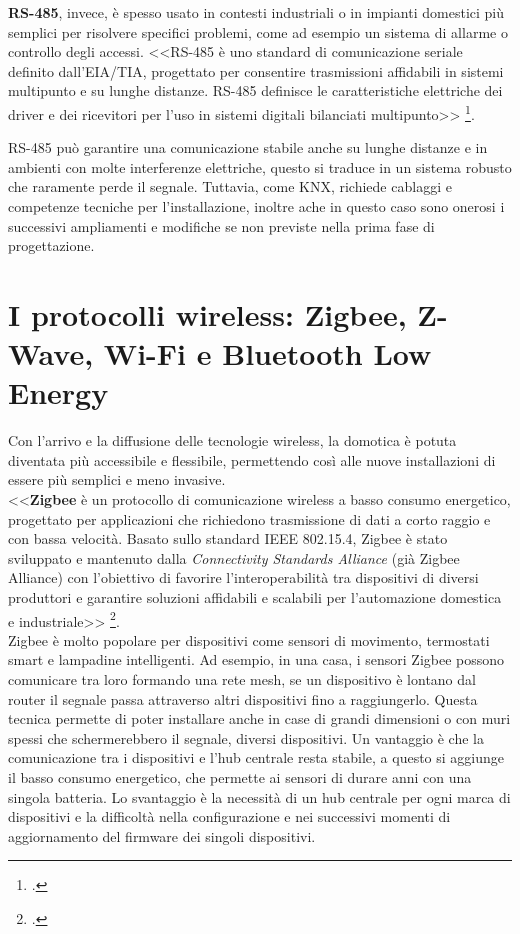 \textbf{RS-485}, invece, è spesso usato in contesti industriali o in impianti domestici più semplici per risolvere specifici problemi, come ad esempio un sistema di allarme o controllo degli accessi. 
<<RS-485 è uno standard di comunicazione seriale definito dall’EIA/TIA, progettato per consentire trasmissioni affidabili in sistemi multipunto e su lunghe distanze. RS-485 definisce le caratteristiche elettriche dei driver e dei ricevitori per l’uso in sistemi digitali bilanciati multipunto>> \footcite{wikipedia_rs485}.

RS-485 può garantire una comunicazione stabile anche su lunghe distanze e in ambienti con molte interferenze elettriche, questo si traduce in un sistema robusto che raramente perde il segnale. Tuttavia, come KNX, richiede cablaggi e competenze tecniche per l’installazione, inoltre ache in questo caso sono onerosi i successivi ampliamenti e modifiche se non previste nella prima fase di progettazione.

\section{I protocolli wireless: Zigbee, Z-Wave, Wi-Fi e Bluetooth Low Energy}
Con l'arrivo e la diffusione delle tecnologie wireless, la domotica è potuta diventata più accessibile e flessibile, permettendo così alle  nuove installazioni di essere più semplici e meno invasive.\\

<<\textbf{Zigbee} è un protocollo di comunicazione wireless a basso consumo energetico, progettato per applicazioni che richiedono trasmissione di dati a corto raggio e con bassa velocità. Basato sullo standard IEEE 802.15.4, Zigbee è stato sviluppato e mantenuto dalla \emph{Connectivity Standards Alliance} (già Zigbee Alliance) con l’obiettivo di favorire l’interoperabilità tra dispositivi di diversi produttori e garantire soluzioni affidabili e scalabili per l’automazione domestica e industriale>> \footcite{csa_zigbee}.\\

Zigbee è molto popolare per dispositivi come sensori di movimento, termostati smart e lampadine intelligenti. Ad esempio, in una casa, i sensori Zigbee possono comunicare tra loro formando una rete mesh,  se un dispositivo è lontano dal router il segnale passa attraverso altri dispositivi fino a raggiungerlo. Questa tecnica permette di poter installare anche in case di grandi dimensioni o con muri spessi che schermerebbero il segnale, diversi dispositivi.
Un vantaggio è che la comunicazione tra i dispositivi e l'hub centrale resta stabile, a questo si aggiunge il basso consumo energetico, che permette ai sensori di durare anni con una singola batteria. 
Lo svantaggio è la necessità di un hub centrale per ogni marca di dispositivi e la difficoltà nella configurazione e nei successivi momenti di aggiornamento del firmware dei singoli dispositivi.\\


